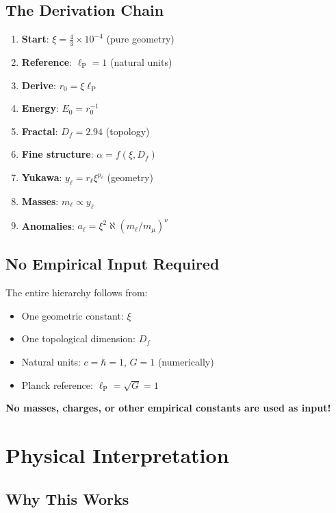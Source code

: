 \documentclass[12pt,a4paper]{article}
\newcommand{\lP}{\ell_{\text{P}}}
\newcommand{\rzero}{r_0}
\newcommand{\Ezero}{E_0}
\newcommand{\xipar}{\xi}  %
\begin{document}
	\subsection{The Derivation Chain}
	
	\begin{enumerate}
		\item \textbf{Start}: $\xipar = \frac{4}{3} \times 10^{-4}$ (pure geometry)
		\item \textbf{Reference}: $\lP = 1$ (natural units)
		\item \textbf{Derive}: $\rzero = \xipar \lP$
		\item \textbf{Energy}: $\Ezero = \rzero^{-1}$
		\item \textbf{Fractal}: $D_f = 2.94$ (topology)
		\item \textbf{Fine structure}: $\alpha = f(\xipar, D_f)$
		\item \textbf{Yukawa}: $y_\ell = r_\ell \xipar^{p_\ell}$ (geometry)
		\item \textbf{Masses}: $m_\ell \propto y_\ell$
		\item \textbf{Anomalies}: $a_\ell = \xipar^2 \aleph (m_\ell/m_\mu)^\nu$
	\end{enumerate}
	
	\subsection{No Empirical Input Required}
	
	The entire hierarchy follows from:
	\begin{itemize}
		\item One geometric constant: $\xipar$
		\item One topological dimension: $D_f$
		\item Natural units: $c = \hbar = 1$, $G = 1$ (numerically)
		\item Planck reference: $\lP = \sqrt{G} = 1$
	\end{itemize}
	
	\textbf{No masses, charges, or other empirical constants are used as input!}
	
	\section{Physical Interpretation}
	
	\subsection{Why This Works}
	
\end{document}
